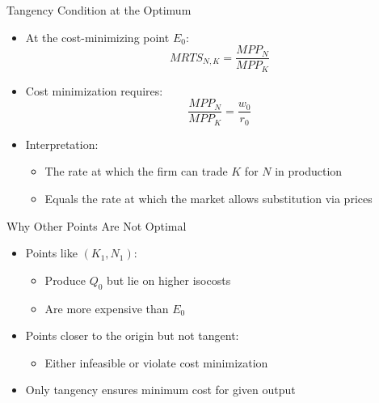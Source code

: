 \documentclass[aspectratio=169]{beamer}
\begin{document}

\begin{frame}{Tangency Condition at the Optimum}
\begin{itemize}
\item At the cost-minimizing point $E_0$:
\[
MRTS_{N,K} = \frac{MPP_N}{MPP_K}
\]
\item Cost minimization requires:
\[
\frac{MPP_N}{MPP_K} = \frac{w_0}{r_0}
\]
\item Interpretation:
\begin{itemize}
\item The rate at which the firm can trade $K$ for $N$ in production
\item Equals the rate at which the market allows substitution via prices
\end{itemize}
\end{itemize}
\end{frame}


\begin{frame}{Why Other Points Are Not Optimal}
\begin{itemize}
\item Points like $(K_1, N_1)$:
\begin{itemize}
\item Produce $Q_0$ but lie on higher isocosts
\item Are more expensive than $E_0$
\end{itemize}
\item Points closer to the origin but not tangent:
\begin{itemize}
\item Either infeasible or violate cost minimization
\end{itemize}
\item Only tangency ensures minimum cost for given output
\end{itemize}
\end{frame}

\end{document}
